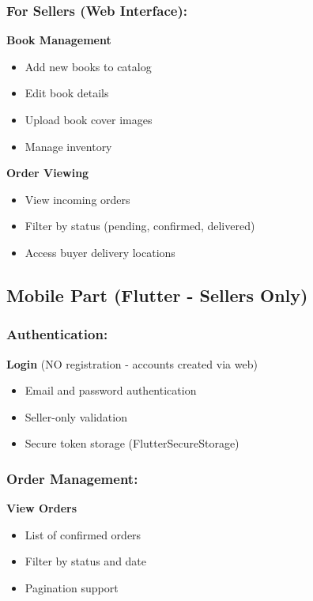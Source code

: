 \documentclass[12pt,a4paper]{article}
\begin{document}
\subsubsection{For Sellers (Web Interface):}

\textbf{Book Management}
\begin{itemize}
    \item Add new books to catalog
    \item Edit book details
    \item Upload book cover images
    \item Manage inventory
\end{itemize}

\textbf{Order Viewing}
\begin{itemize}
    \item View incoming orders
    \item Filter by status (pending, confirmed, delivered)
    \item Access buyer delivery locations
\end{itemize}

\subsection{Mobile Part (Flutter - Sellers Only)}

\subsubsection{Authentication:}

\textbf{Login} (NO registration - accounts created via web)
\begin{itemize}
    \item Email and password authentication
    \item Seller-only validation
    \item Secure token storage (FlutterSecureStorage)
\end{itemize}

\subsubsection{Order Management:}

\textbf{View Orders}
\begin{itemize}
    \item List of confirmed orders
    \item Filter by status and date
    \item Pagination support
\end{itemize}
\end{document}
